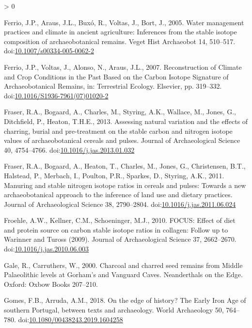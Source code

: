\documentclass[5p]{elsarticle} %
\newlength{\cslhangindent}
\newenvironment{CSLReferences}[2] %
 {%
  \setlength{\parindent}{0pt}
  \ifodd #1 \everypar{\setlength{\hangindent}{\cslhangindent}}\ignorespaces\fi
  \ifnum #2 > 0
  \setlength{\parskip}{#2\baselineskip}
  \fi
 }%
 {}
\begin{document}
\begin{CSLReferences}{1}{0}
\leavevmode\hypertarget{ref-ferrio_etal05}{}%
Ferrio, J.P., Araus, J.L., Buxó, R., Voltas, J., Bort, J., 2005. Water management practices and climate in ancient agriculture: Inferences from the stable isotope composition of archaeobotanical remains. Veget Hist Archaeobot 14, 510--517. doi:\href{https://doi.org/10.1007/s00334-005-0062-2}{10.1007/s00334-005-0062-2}

\leavevmode\hypertarget{ref-ferrio_etal07}{}%
Ferrio, J.P., Voltas, J., Alonso, N., Araus, J.L., 2007. Reconstruction of {Climate} and {Crop Conditions} in the {Past Based} on the {Carbon Isotope Signature} of {Archaeobotanical Remains}, in: Terrestrial {Ecology}. {Elsevier}, pp. 319--332. doi:\href{https://doi.org/10.1016/S1936-7961(07)01020-2}{10.1016/S1936-7961(07)01020-2}

\leavevmode\hypertarget{ref-fraser_etal13a}{}%
Fraser, R.A., Bogaard, A., Charles, M., Styring, A.K., Wallace, M., Jones, G., Ditchfield, P., Heaton, T.H.E., 2013. Assessing natural variation and the effects of charring, burial and pre-treatment on the stable carbon and nitrogen isotope values of archaeobotanical cereals and pulses. Journal of Archaeological Science 40, 4754--4766. doi:\href{https://doi.org/10.1016/j.jas.2013.01.032}{10.1016/j.jas.2013.01.032}

\leavevmode\hypertarget{ref-fraser_etal11}{}%
Fraser, R.A., Bogaard, A., Heaton, T., Charles, M., Jones, G., Christensen, B.T., Halstead, P., Merbach, I., Poulton, P.R., Sparkes, D., Styring, A.K., 2011. Manuring and stable nitrogen isotope ratios in cereals and pulses: Towards a new archaeobotanical approach to the inference of land use and dietary practices. Journal of Archaeological Science 38, 2790--2804. doi:\href{https://doi.org/10.1016/j.jas.2011.06.024}{10.1016/j.jas.2011.06.024}

\leavevmode\hypertarget{ref-froehle_etal10}{}%
Froehle, A.W., Kellner, C.M., Schoeninger, M.J., 2010. {FOCUS}: Effect of diet and protein source on carbon stable isotope ratios in collagen: Follow up to {Warinner} and {Tuross} (2009). Journal of Archaeological Science 37, 2662--2670. doi:\href{https://doi.org/10.1016/j.jas.2010.06.003}{10.1016/j.jas.2010.06.003}

\leavevmode\hypertarget{ref-gale_carruthers00}{}%
Gale, R., Carruthers, W., 2000. Charcoal and charred seed remains from {Middle Palaeolithic} levels at {Gorham}'s and {Vanguard Caves}. Neanderthals on the Edge. Oxford: Oxbow Books 207--210.

\leavevmode\hypertarget{ref-gomes_arruda18}{}%
Gomes, F.B., Arruda, A.M., 2018. On the edge of history? {The Early Iron Age} of southern {Portugal}, between texts and archaeology. World Archaeology 50, 764--780. doi:\href{https://doi.org/10.1080/00438243.2019.1604258}{10.1080/00438243.2019.1604258}


\end{CSLReferences}
\end{document}
